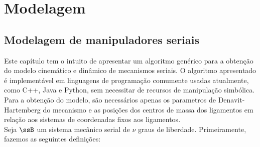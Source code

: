 \documentclass[]{politex}
\begin{document}

\part{Modelagem}
	
\chapter{Modelagem de manipuladores seriais}

Este capítulo tem o intuito de apresentar um algoritmo genérico para a obtenção do modelo cinemático e dinâmico de mecanismos seriais. O algoritmo apresentado é implementável em linguagens de programação comumente usadas atualmente, como C++, Java e Python, sem necessitar de recursos de manipulação simbólica. \\
Para a obtenção do modelo, são necessários apenas os parametros de Denavit-Hartemberg \cite{Craig, Denavit, Lipkin, Cabral} do mecanismo e as posições dos centros de massa dos ligamentos em relação aos sistemas de coordenadas fixos aos ligamentos. \\ 

Seja $\ssB$ um sistema mecânico serial de $\nu$ graus de liberdade. Primeiramente, fazemos as seguintes definições:
\end{document}
